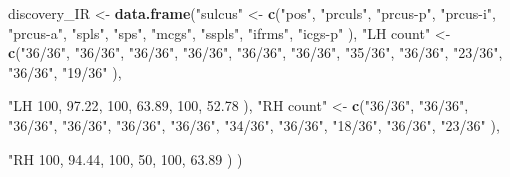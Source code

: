 \documentclass[
]{article}
\newenvironment{Shaded}{\begin{snugshade}}{\end{snugshade}}
\newcommand{\DecValTok}[1]{\textcolor[rgb]{0.00,0.00,0.81}{#1}}
\newcommand{\FloatTok}[1]{\textcolor[rgb]{0.00,0.00,0.81}{#1}}
\newcommand{\KeywordTok}[1]{\textcolor[rgb]{0.13,0.29,0.53}{\textbf{#1}}}
\newcommand{\NormalTok}[1]{#1}
\newcommand{\StringTok}[1]{\textcolor[rgb]{0.31,0.60,0.02}{#1}}
\begin{document}
\begin{Shaded}
\begin{Highlighting}[]
\NormalTok{discovery_IR <-}\StringTok{ }\KeywordTok{data.frame}\NormalTok{(}\StringTok{"sulcus"}\NormalTok{ <-}\StringTok{ }\KeywordTok{c}\NormalTok{(}\StringTok{"pos"}\NormalTok{, }\StringTok{"prculs"}\NormalTok{, }\StringTok{"prcus-p"}\NormalTok{, }\StringTok{"prcus-i"}\NormalTok{, }\StringTok{"prcus-a"}\NormalTok{, }
                                         \StringTok{"spls"}\NormalTok{, }\StringTok{"sps"}\NormalTok{, }\StringTok{"mcgs"}\NormalTok{, }\StringTok{"sspls"}\NormalTok{, }\StringTok{"ifrms"}\NormalTok{, }\StringTok{"icgs-p"} 
\NormalTok{                                       ),}
                      \StringTok{"LH count"}\NormalTok{ <-}\StringTok{ }\KeywordTok{c}\NormalTok{(}\StringTok{"36/36"}\NormalTok{, }\StringTok{"36/36"}\NormalTok{, }\StringTok{"36/36"}\NormalTok{, }\StringTok{"36/36"}\NormalTok{, }\StringTok{"36/36"}\NormalTok{,}
                                      \StringTok{"36/36"}\NormalTok{, }\StringTok{"35/36"}\NormalTok{, }\StringTok{"36/36"}\NormalTok{, }\StringTok{"23/36"}\NormalTok{, }\StringTok{"36/36"}\NormalTok{, }\StringTok{"19/36"}
\NormalTok{                           ),}
                           \StringTok{"LH %"}\NormalTok{ <-}\StringTok{ }\KeywordTok{c}\NormalTok{(}\DecValTok{100}\NormalTok{, }\DecValTok{100}\NormalTok{, }\DecValTok{100}\NormalTok{, }\DecValTok{100}\NormalTok{, }\DecValTok{100}\NormalTok{,}
                                       \DecValTok{100}\NormalTok{, }\FloatTok{97.22}\NormalTok{, }\DecValTok{100}\NormalTok{, }\FloatTok{63.89}\NormalTok{, }\DecValTok{100}\NormalTok{, }\FloatTok{52.78}
\NormalTok{                           ),}
                           \StringTok{"RH count"}\NormalTok{ <-}\StringTok{ }\KeywordTok{c}\NormalTok{(}\StringTok{"36/36"}\NormalTok{, }\StringTok{"36/36"}\NormalTok{, }\StringTok{"36/36"}\NormalTok{, }\StringTok{"36/36"}\NormalTok{, }\StringTok{"36/36"}\NormalTok{,}
                                      \StringTok{"36/36"}\NormalTok{, }\StringTok{"34/36"}\NormalTok{, }\StringTok{"36/36"}\NormalTok{, }\StringTok{"18/36"}\NormalTok{, }\StringTok{"36/36"}\NormalTok{, }\StringTok{"23/36"}
\NormalTok{                      ),}
                           \StringTok{"RH %"}\NormalTok{ <-}\StringTok{ }\KeywordTok{c}\NormalTok{(}\DecValTok{100}\NormalTok{, }\DecValTok{100}\NormalTok{, }\DecValTok{100}\NormalTok{, }\DecValTok{100}\NormalTok{, }\DecValTok{100}\NormalTok{,}
                                       \DecValTok{100}\NormalTok{, }\FloatTok{94.44}\NormalTok{, }\DecValTok{100}\NormalTok{, }\DecValTok{50}\NormalTok{, }\DecValTok{100}\NormalTok{, }\FloatTok{63.89}
\NormalTok{                      )}
\NormalTok{                           )}

}}
\end{Highlighting}
\end{Shaded}
\end{document}
